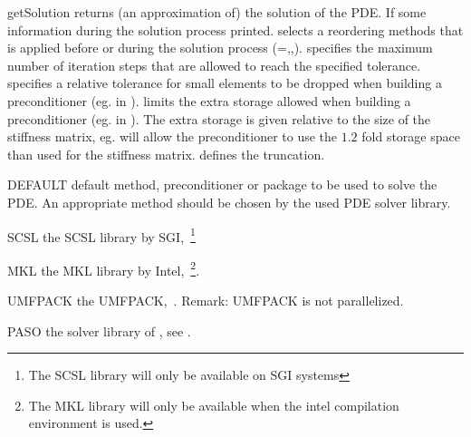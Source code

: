 \begin{methoddesc}[LinearPDE]{getSolution}{
}
returns (an approximation of) the solution of the PDE. If  some information during the solution process printed.
 selects a reordering methods that is applied before or during the solution process
(=\NOREORDERING ,\MINIMUMFILLIN ,\NESTEDDESCTION).
 specifies the maximum number of iteration steps that are allowed to reach the specified tolerance.
 specifies a relative tolerance for small elements to be dropped when building a preconditioner
(eg. in \ILUT).  limits the extra storage allowed when building a preconditioner
(eg. in \ILUT). The extra storage is given relative to the size of the stiffness matrix, eg.
 will allow the preconditioner to use the $1.2$ fold storage space than used
for the stiffness matrix.  defines the truncation.
\end{methoddesc}

\begin{memberdesc}[LinearPDE]{DEFAULT}
default method, preconditioner or package to be used to solve the PDE. An appropriate method should be
chosen by the used PDE solver library.
\end{memberdesc}

\begin{memberdesc}[LinearPDE]{SCSL}
the SCSL library by SGI,~\footnote{The SCSL library will only be available on SGI systems}
\end{memberdesc}

\begin{memberdesc}[LinearPDE]{MKL}
the MKL library by Intel,~\footnote{The MKL library will only be available when the intel compilation environment is used.}.
\end{memberdesc}

\begin{memberdesc}[LinearPDE]{UMFPACK}
the UMFPACK,~. Remark: UMFPACK is not parallelized.
\end{memberdesc}

\begin{memberdesc}[LinearPDE]{PASO}
the solver library of \finley, see .
\end{memberdesc}

